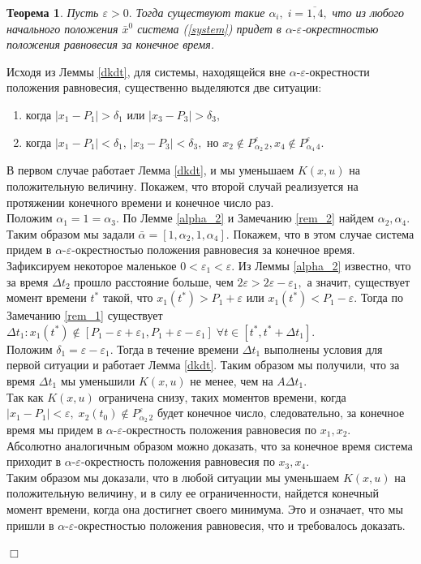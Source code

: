 \documentclass[11pt]{article}
\newtheorem{theorem}{Теорема}
\theoremstyle{definition}
\newenvironment{Proof}
{\par\noindent{\bf Доказательство.\\}} 
{\begin{flushright}$\Box$\end{flushright}}
\newcommand\Ref[1]{(\ref{#1})}
\newcommand\RS{\Ref{system} }
\begin{document}
\begin{theorem} 
	Пусть $\varepsilon > 0.$ Тогда существуют такие $\alpha_i,\; i = \overline{1,4},$ что из любого начального положения $\bar x^0$ система \RS придет в $\alpha\text{-}\varepsilon$-окрестностью положения равновесия за конечное время.
\end{theorem}
\begin{Proof}
	Исходя из Леммы \ref{dkdt}, для системы, находящейся вне $\alpha\text{-}\varepsilon$-окрестности положения равновесия, существенно выделяются две ситуации:
	\begin{enumerate}
		\item когда $|x_1 - P_1| > \delta_1$ или $|x_3 - P_3| > \delta_3,$
		\item когда $|x_1 - P_1| < \delta_1, \, |x_3 - P_3| < \delta_3,$ но $x_2 \not \in P_{\alpha_2 \,2}^{\varepsilon}, x_4 \not \in P_{\alpha_4 \,4}^{\varepsilon}.$
	\end{enumerate}
	В первом случае работает Лемма \ref{dkdt}, и мы уменьшаем $K(x,u)$ на положительную величину. Покажем, что второй случай реализуется на протяжении конечного времени и конечное число раз.\\
	Положим $\alpha_1 = 1 = \alpha_3.$ По Лемме \ref{alpha_2} и Замечанию \ref{rem_2} найдем $\alpha_2, \alpha_4.$ Таким образом мы задали $\bar \alpha = [1,\alpha_2,1,\alpha_4].$ Покажем, что в этом случае система придем в $\alpha\text{-}\varepsilon$-окрестностью положения равновесия за конечное время.\\
	Зафиксируем некоторое маленькое $0 < \varepsilon_1 < \varepsilon.$ Из Леммы \ref{alpha_2} известно, что за время $\Delta t_2$ прошло расстояние больше, чем $2\varepsilon > 2\varepsilon - \varepsilon_1,$ а значит, существует момент времени $t^*$ такой, что $x_1(t^*) > P_1 + \varepsilon$ или $x_1(t^*) < P_1 - \varepsilon.$ Тогда по Замечанию \ref{rem_1} существует $\Delta t_1 : x_1(t^*) \not \in [P_1 - \varepsilon + \varepsilon_1, P_1 + \varepsilon - \varepsilon_1] \; \forall t \in [t^*, t^* + \Delta t_1].$ \\
	Положим $\delta_1 = \varepsilon - \varepsilon_1.$ Тогда в течение времени $\Delta t_1$ выполнены условия для первой ситуации и работает Лемма \ref{dkdt}. Таким образом мы получили, что за время $\Delta t_1$ мы уменьшили $K(x,u)$ не менее, чем на $A\Delta t_1.$ \\
	Так как $K(x,u)$ ограничена снизу, таких моментов времени, когда $|x_1 - P_1| < \varepsilon, \; x_2(t_0) \not \in P_{\alpha_2 \, 2}^{\varepsilon}$ будет конечное число, следовательно, за конечное время мы придем в $\alpha\text{-}\varepsilon$-окрестность положения равновесия по $x_1, x_2.$ \\
	Абсолютно аналогичным образом можно доказать, что за конечное время система приходит в $\alpha\text{-}\varepsilon$-окрестность положения равновесия по $x_3, x_4.$\\
	Таким образом мы доказали, что в любой ситуации мы уменьшаем $K(x,u)$ на положительную величину, и в силу ее ограниченности, найдется конечный момент времени, когда она достигнет своего минимума. Это и означает, что мы пришли в $\alpha\text{-}\varepsilon$-окрестностью положения равновесия, что и требовалось доказать.
\end{Proof}
\end{document}

